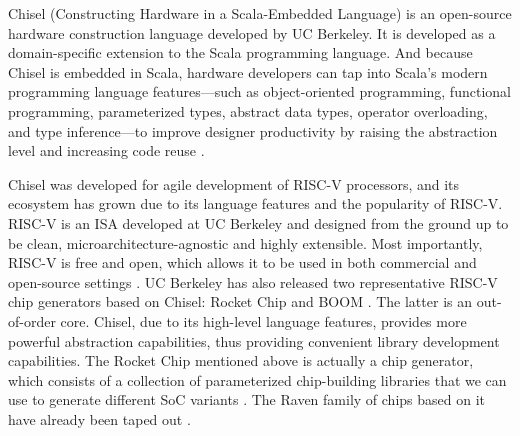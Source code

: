 \documentclass[conference]{IEEEtran}
\theoremstyle{definition}
\begin{document}
Chisel (Constructing Hardware in a Scala-Embedded Language) is an open-source hardware construction language developed by UC Berkeley. It is developed as a domain-specific extension to the Scala programming language. And because Chisel is embedded in Scala, hardware developers can tap into Scala’s modern programming language features—such as object-oriented programming, functional programming, parameterized types, abstract data types, operator overloading, and type inference—to improve designer productivity by raising the abstraction level and increasing code reuse \cite{lee2016agile}.

Chisel was developed for agile development of RISC-V processors, and its ecosystem has grown due to its language features and the popularity of RISC-V.
RISC-V is an ISA developed at UC Berkeley and designed from the ground up to be clean, microarchitecture-agnostic and highly extensible. Most importantly, RISC-V is free and open, which allows it to be used in both commercial and open-source settings \cite{asanovic2014instruction}.
UC Berkeley has also released two representative RISC-V chip generators based on Chisel: Rocket Chip \cite{asanovic2016rocket} and BOOM \cite{celio2017boomv2}.
The latter is an out-of-order core.
Chisel, due to its high-level language features, provides more powerful abstraction capabilities, thus providing convenient library development capabilities. 
The Rocket Chip mentioned above is actually a chip generator, which consists of a collection of parameterized chip-building libraries that we can use to generate different SoC variants \cite{asanovic2016rocket}.
The Raven family of chips based on it have already been taped out \cite{lee2015raven}.
\end{document}
